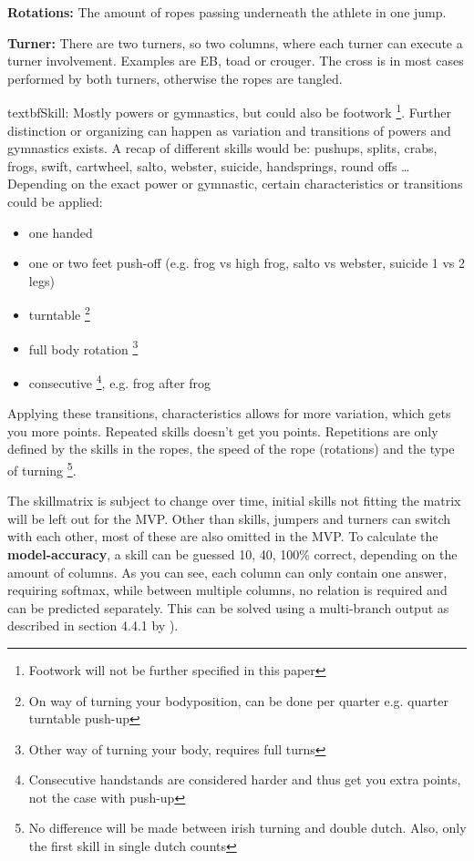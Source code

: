 \textbf{Rotations:} The amount of ropes passing underneath the athlete in one jump.

\textbf{Turner:} There are two turners, so two columns, where each turner can execute a turner involvement. Examples are EB, toad or crouger. The cross is in most cases performed by both turners, otherwise the ropes are tangled.

textbf{Skill:} Mostly powers or gymnastics, but could also be footwork \footnote{Footwork will not be further specified in this paper}. Further distinction or organizing can happen as variation and transitions of powers and gymnastics exists. A recap of different skills would be: pushups, splits, crabs, frogs, swift, cartwheel, salto, webster, suicide, handsprings, round offs \dots %
Depending on the exact power or gymnastic, certain characteristics or transitions could be applied:

\begin{itemize}
    \item one handed
    \item one or two feet push-off (e.g. frog vs high frog, salto vs webster, suicide 1 vs 2 legs)
    \item turntable \footnote{On way of turning your bodyposition, can be done per quarter e.g. quarter turntable push-up}
    \item full body rotation \footnote{Other way of turning your body, requires full turns}
    \item consecutive \footnote{Consecutive handstands are considered harder and thus get you extra points, not the case with push-up}, e.g. frog after frog
\end{itemize}

Applying these transitions, characteristics allows for more variation, which gets you more points. Repeated skills doesn't get you points. Repetitions are only defined by the skills in the ropes, the speed of the rope (rotations) and the type of turning \footnote{No difference will be made between irish turning and double dutch. Also, only the first skill in single dutch counts}.

\medskip
    
The skillmatrix is subject to change over time, initial skills not fitting the matrix will be left out for the MVP. Other than skills, jumpers and turners can switch with each other, most of these are also omitted in the MVP.
To calculate the \textbf{model-accuracy}, a skill can be guessed 10, 40, 100\% correct, depending on the amount of columns. As you can see, each column can only contain one answer, requiring softmax, while between multiple columns, no relation is required and can be predicted separately. This can be solved using a multi-branch output as described in section 4.4.1 by \autocite{Coulibaly_2022}). 

